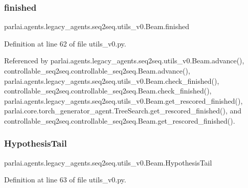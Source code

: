 \subsubsection{\texorpdfstring{finished}{finished}}
{\footnotesize\ttfamily parlai.\+agents.\+legacy\+\_\+agents.\+seq2seq.\+utils\+\_\+v0.\+Beam.\+finished}



Definition at line 62 of file utils\+\_\+v0.\+py.



Referenced by parlai.\+agents.\+legacy\+\_\+agents.\+seq2seq.\+utils\+\_\+v0.\+Beam.\+advance(), controllable\+\_\+seq2seq.\+controllable\+\_\+seq2seq.\+Beam.\+advance(), parlai.\+agents.\+legacy\+\_\+agents.\+seq2seq.\+utils\+\_\+v0.\+Beam.\+check\+\_\+finished(), controllable\+\_\+seq2seq.\+controllable\+\_\+seq2seq.\+Beam.\+check\+\_\+finished(), parlai.\+agents.\+legacy\+\_\+agents.\+seq2seq.\+utils\+\_\+v0.\+Beam.\+get\+\_\+rescored\+\_\+finished(), parlai.\+core.\+torch\+\_\+generator\+\_\+agent.\+Tree\+Search.\+get\+\_\+rescored\+\_\+finished(), and controllable\+\_\+seq2seq.\+controllable\+\_\+seq2seq.\+Beam.\+get\+\_\+rescored\+\_\+finished().

\mbox{\label{classparlai_1_1agents_1_1legacy__agents_1_1seq2seq_1_1utils__v0_1_1Beam_aa6b1326a200ef63b4b19fbbffc82a14c}} 
\subsubsection{\texorpdfstring{Hypothesis\+Tail}{HypothesisTail}}
{\footnotesize\ttfamily parlai.\+agents.\+legacy\+\_\+agents.\+seq2seq.\+utils\+\_\+v0.\+Beam.\+Hypothesis\+Tail}



Definition at line 63 of file utils\+\_\+v0.\+py.



